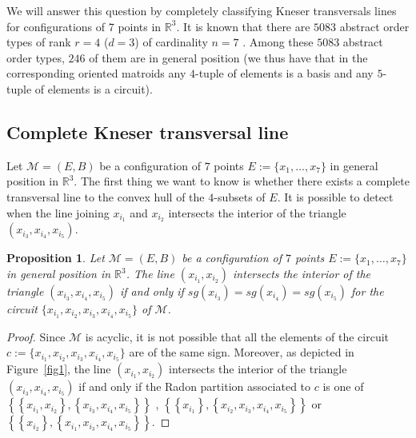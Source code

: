 \documentclass[11pt]{amsart}
\theoremstyle{plain}
\newtheorem{proposition}[theorem]{Proposition}
\theoremstyle{definition}
\theoremstyle{remark}
\begin{document}
We will answer this question by completely classifying Kneser transversals lines for configurations of 7 points in ${\mathbb{R}}^3$. It is known that there are $5083$ abstract order types of rank $r=4$ ($d=3$) of cardinality $n=7$ \cite{F}. Among these $5083$ abstract order types, $246$ of them are in general position (we thus have that in the corresponding oriented matroids any $4$-tuple of elements is a basis and any $5$-tuple of elements is a circuit).

\subsection{Complete Kneser transversal line}

Let $\mathcal{M}=(E,B)$ be a configuration of $7$ points $E:=\{x_1,\ldots,x_7\}$ in general position in ${\mathbb{R}}^3$. The first thing we want to know is whether there exists a complete transversal line to the convex hull of the $4$-subsets of $E$. It is possible to detect when the line joining $x_{i_1}$ and $x_{i_2}$ intersects the interior of the triangle $(x_{i_3},x_{i_4},x_{i_5})$.

\begin{proposition}\label{prop1}
Let $\mathcal{M}=(E,B)$ be a configuration of $7$ points $E:=\{x_1,\ldots,x_7\}$ in general position in ${\mathbb{R}}^3$. The line $(x_{i_1},x_{i_2})$ intersects the interior of the triangle $(x_{i_3},x_{i_4},x_{i_5})$ if and only if $sg(x_{i_3})=sg(x_{i_4})=sg(x_{i_5})$ for the circuit $\{x_{i_1},x_{i_2},x_{i_3},x_{i_4},x_{i_5}\}$ of $\mathcal{M}$.
\end{proposition}

\begin{proof}
Since $\mathcal{M}$ is acyclic, it is not possible that all the elements of the circuit $c:=\{x_{i_1},x_{i_2},x_{i_3},x_{i_4},x_{i_5}\}$ are of the same sign. Moreover, as depicted in Figure~\ref{fig1}, the line $(x_{i_1},x_{i_2})$ intersects the interior of the triangle $(x_{i_3},x_{i_4},x_{i_5})$ if and only if the Radon partition associated to $c$ is one of $\left\{ \left\{ x_{i_1},x_{i_2} \right\} , \left\{ x_{i_3},x_{i_4},x_{i_5} \right\} \right\}$ , $\left\{ \left\{ x_{i_1} \right\} , \left\{ x_{i_2},x_{i_3},x_{i_4},x_{i_5} \right\} \right\}$ or \\
$\left\{ \left\{ x_{i_2} \right\} , \left\{ x_{i_1},x_{i_3},x_{i_4},x_{i_5} \right\} \right\}$.
\end{proof}
\end{document}
